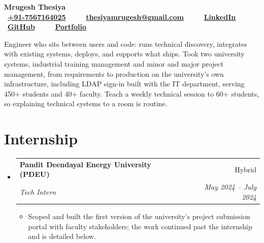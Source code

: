 \documentclass[a4paper,11pt]{article}
\makeatletter
\newcommand{\resumeSubheadingFull}[4]{
  \vspace{-1pt}\item
    \begin{tabular*}{0.97\textwidth}{l@{\extracolsep{\fill}}r}
    \textbf{#1} & #2 \\
    \textit{#3} & \textit{#4} \\
    \end{tabular*}\vspace{-5pt}
}
\newcommand{\resumeSubHeadingListStart}{\begin{itemize}[leftmargin=*]}
\newcommand{\resumeSubHeadingListEnd}{\end{itemize}}
\newcommand{\resumeItemListStart}{\begin{itemize}[itemsep=1pt,topsep=3pt]\small}
\newcommand{\resumeItemListEnd}{\end{itemize}\vspace{-3pt}}
\makeatother
\begin{document}
\begin{center}
    \vspace*{-14pt}
    {\fontsize{32}{36}\selectfont \textbf{Mrugesh Thesiya}}\\[7pt]
    {\small
    \faPhone ~\textbf{\href{tel:+917567164025}{+91-7567164025}}~~~~
    \faEnvelope ~\textbf{\href{mailto:thesiyamrugesh@gmail.com}{thesiyamrugesh@gmail.com}}~~~~
    \faLinkedin ~\textbf{\href{https://www.linkedin.com/in/mrugeshthesiya/}{LinkedIn}}~~~~
    \faGithub ~\textbf{\href{https://github.com/MrugeshThesiya}{GitHub}}~~~~
    \faGlobe ~\textbf{\href{https://mrugesh.pages.dev/}{Portfolio}}
    }
\end{center}

\small{Engineer who sits between users and code: runs technical discovery, integrates with existing systems, deploys, and supports what ships. Took two university systems, industrial training management and minor and major project management, from requirements to production on the university's own infrastructure, including LDAP sign-in built with the IT department, serving 450+ students and 40+ faculty. Teach a weekly technical session to 60+ students, so explaining technical systems to a room is routine.}

\section{Internship}
  \resumeSubHeadingListStart
    \resumeSubheadingFull{Pandit Deendayal Energy University (PDEU)}{Hybrid}
      {Tech Intern}{May 2024 -- July 2024}
      \resumeItemListStart
        \item Scoped and built the first version of the university's project submission portal with faculty stakeholders; the work continued past the internship and is detailed below.
      \resumeItemListEnd
  \resumeSubHeadingListEnd

\end{document}
